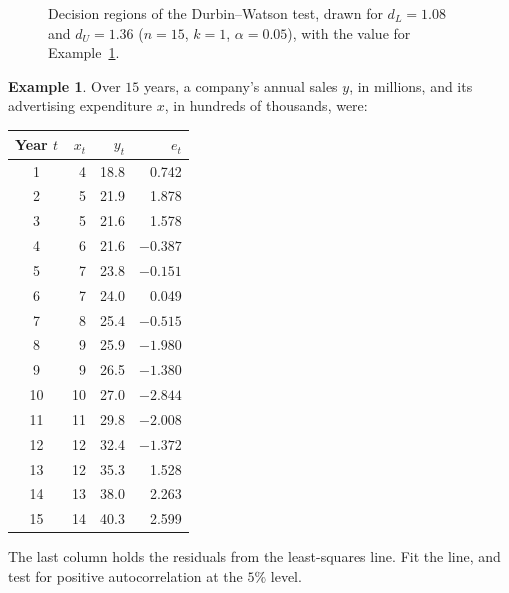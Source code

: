\documentclass[11pt,a4paper]{article}
\numberwithin{equation}{section}
\theoremstyle{definition}
\newtheorem{exa}[thm]{Example}
\begin{document}
\begin{figure}[H]
\centering
{}
\caption{Decision regions of the Durbin--Watson test, drawn for $d_L = 1.08$ and $d_U = 1.36$ ($n = 15$, $k = 1$,
$\alpha = 0.05$), with the value for Example~\ref{exa:sales}.}
\label{fig:dw}
\end{figure}

\begin{exa}\label{exa:sales}
Over $15$ years, a company's annual sales $y$, in millions, and its advertising expenditure $x$, in
hundreds of thousands, were:
\begin{center}
\begin{tabular}{crrr}
Year $t$ & $x_t$ & $y_t$ & $e_t$ \\
\hline
1 & 4 & 18.8 & 0.742 \\
2 & 5 & 21.9 & 1.878 \\
3 & 5 & 21.6 & 1.578 \\
4 & 6 & 21.6 & $-0.387$ \\
5 & 7 & 23.8 & $-0.151$ \\
6 & 7 & 24.0 & 0.049 \\
7 & 8 & 25.4 & $-0.515$ \\
8 & 9 & 25.9 & $-1.980$ \\
9 & 9 & 26.5 & $-1.380$ \\
10 & 10 & 27.0 & $-2.844$ \\
11 & 11 & 29.8 & $-2.008$ \\
12 & 12 & 32.4 & $-1.372$ \\
13 & 12 & 35.3 & 1.528 \\
14 & 13 & 38.0 & 2.263 \\
15 & 14 & 40.3 & 2.599 \\
\end{tabular}
\end{center}
The last column holds the residuals from the least-squares line. Fit the line, and test for positive
autocorrelation at the $5\%$ level.
\end{exa}
\end{document}

